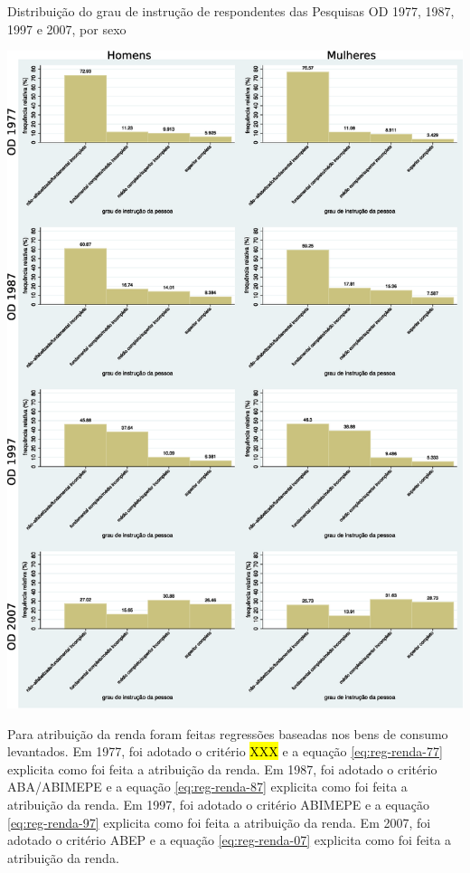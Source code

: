 \begin{grafico}[htb]%
    \caption{\label{graf:distr-grau-instr} Distribuição do grau de instrução de respondentes das Pesquisas OD 1977, 1987, 1997 e 2007, por sexo}%
    \begin{center}%
        \includegraphics[width=1\textwidth]{./imagens/grauinstr2.eps}%
    \end{center}%
\end{grafico}%

\clearpage
Para atribuição da renda foram feitas regressões baseadas nos bens de consumo levantados.
Em 1977, foi adotado o critério \hl{XXX} e a equação \eqref{eq:reg-renda-77} explicita como foi feita a atribuição da renda.
Em 1987, foi adotado o critério ABA/ABIMEPE e a equação \eqref{eq:reg-renda-87} explicita como foi feita a atribuição da renda. 
Em 1997, foi adotado o critério ABIMEPE e a equação \eqref{eq:reg-renda-97} explicita como foi feita a atribuição da renda.
Em 2007, foi adotado o critério ABEP e a equação \eqref{eq:reg-renda-07} explicita como foi feita a atribuição da renda.

